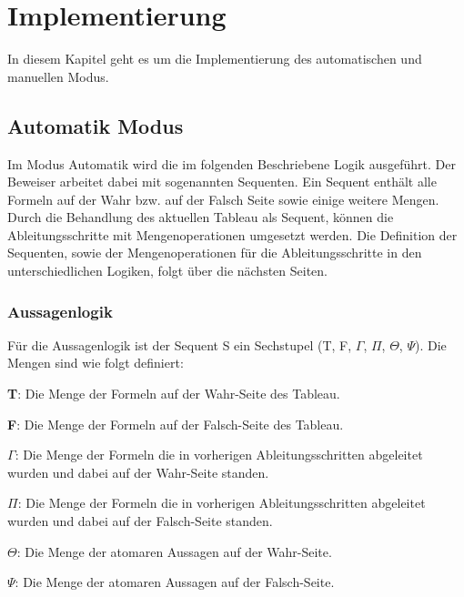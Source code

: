
\chapter{Implementierung}
In diesem Kapitel geht es um die Implementierung des automatischen und manuellen Modus.

\section{Automatik Modus}
Im Modus Automatik wird die im folgenden Beschriebene Logik ausgeführt. Der Beweiser arbeitet dabei mit sogenannten Sequenten. Ein Sequent enthält alle Formeln auf der Wahr bzw. auf der Falsch Seite sowie einige weitere Mengen. Durch die Behandlung des aktuellen Tableau als Sequent, können die Ableitungsschritte mit Mengenoperationen umgesetzt werden. Die Definition der Sequenten, sowie der Mengenoperationen für die Ableitungsschritte in den unterschiedlichen Logiken, folgt über die nächsten Seiten.

\subsection{Aussagenlogik}
Für die Aussagenlogik ist der Sequent S ein Sechstupel (T, F, $\Gamma$, $\Pi$, $\Theta$, $\Psi$). Die Mengen sind wie folgt definiert:
\begin{description}
\item \textbf{T}: Die Menge der Formeln auf der Wahr-Seite des Tableau.

\item \textbf{F}: Die Menge der Formeln auf der Falsch-Seite des Tableau.

\item \textbf{$\Gamma$}: Die Menge der Formeln die in vorherigen Ableitungsschritten abgeleitet wurden und dabei auf der Wahr-Seite standen.

\item \textbf{$\Pi$}: Die Menge der Formeln die in vorherigen Ableitungsschritten abgeleitet wurden und dabei auf der Falsch-Seite standen.

\item \textbf{$\Theta$}: Die Menge der atomaren Aussagen auf der Wahr-Seite.

\item \textbf{$\Psi$}: Die Menge der atomaren Aussagen auf der Falsch-Seite.
\end{description}

